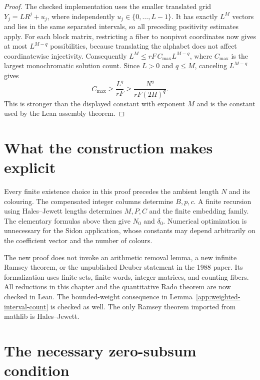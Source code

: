 \begin{proof}
The checked implementation uses the smaller translated grid
$Y_j=LR^j+u_j$, where independently $u_j\in\{0,\ldots,L-1\}$.
It has exactly $L^M$ vectors and lies in the same separated intervals,
so all preceding positivity estimates apply.
For each block matrix, restricting a fiber to nonpivot coordinates now
gives at most $L^{M-q}$ possibilities, because translating the alphabet
does not affect coordinatewise injectivity.
Consequently $L^M\leq rF\,C_{\max}L^{M-q}$, where $C_{\max}$ is the
largest monochromatic solution count.  Since $L>0$ and $q\leq M$,
canceling $L^{M-q}$ gives
\[
 C_{\max}\geq\frac{L^q}{rF}
 \geq\frac{N^q}{rF(2H)^q}.
\]
This is stronger than the displayed constant with exponent $M$ and is
the constant used by the Lean assembly theorem.
\end{proof}

\section{What the construction makes explicit}

Every finite existence choice in this proof precedes the ambient length
$N$ and its colouring.  The compensated integer columns determine
$B,p,c$.  A finite recursion using Hales--Jewett lengths determines
$M,P,C$ and the finite embedding family.  The elementary formulas above
then give $N_0$ and $\delta_0$.  Numerical optimization is unnecessary for
the Sidon application, whose constants may depend arbitrarily on the
coefficient vector and the number of colours.

The new proof does not invoke an arithmetic removal lemma, a new infinite
Ramsey theorem, or the unpublished Deuber statement in the 1988 paper.
Its formalization uses finite sets, finite words, integer matrices, and
counting fibers.  All reductions in this chapter and the quantitative Rado
theorem are now checked in Lean.  The bounded-weight consequence in
Lemma~\ref{app:weighted-interval-count} is checked as well.
The only Ramsey theorem imported from mathlib is
Hales--Jewett.


\section{The necessary zero-subsum condition}

